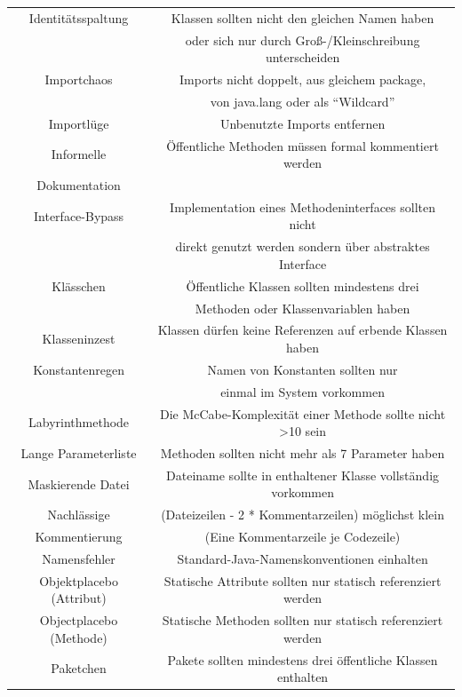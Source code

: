 \documentclass[da,ngerman]{stthesis}
\begin{document}
\begin{center}
\begin{longtabu}{|c|c|}
						\hline
						Identitätsspaltung & Klassen sollten nicht den gleichen Namen haben \\ & oder sich nur durch Groß-/Kleinschreibung unterscheiden \\
						\hline
						Importchaos & Imports nicht doppelt, aus gleichem package, \\ & von java.lang oder als "`Wildcard"' \\
						\hline
						Importlüge & Unbenutzte Imports entfernen \\
						\hline
						Informelle & Öffentliche Methoden müssen formal kommentiert werden \\ Dokumentation & \\
						\hline
						Interface-Bypass & Implementation eines Methodeninterfaces sollten nicht \\ & direkt genutzt werden sondern über abstraktes Interface \\
						\hline
						Klässchen & Öffentliche Klassen sollten mindestens drei \\ & Methoden oder Klassenvariablen haben \\
						\hline
						Klasseninzest & Klassen dürfen keine Referenzen auf erbende Klassen haben \\
						\hline
						Konstantenregen & Namen von Konstanten sollten nur \\ &  einmal im System vorkommen \\
						\hline
						Labyrinthmethode & Die McCabe-Komplexität einer Methode sollte nicht >10 sein \\
						\hline
						Lange Parameterliste & Methoden sollten nicht mehr als 7 Parameter haben \\
						\hline
						Maskierende Datei & Dateiname sollte in enthaltener Klasse vollständig vorkommen \\
						\hline
						Nachlässige & (Dateizeilen - 2 * Kommentarzeilen) möglichst klein \\ Kommentierung & (Eine Kommentarzeile je Codezeile) \\
						\hline
						Namensfehler & Standard-Java-Namenskonventionen einhalten \\
						\hline
						Objektplacebo (Attribut) & Statische Attribute sollten nur statisch referenziert werden \\
						\hline
						Objectplacebo (Methode) & Statische Methoden sollten nur statisch referenziert werden \\
						\hline
						Paketchen & Pakete sollten mindestens drei öffentliche Klassen enthalten \\

\end{longtabu}
\end{center}
\end{document}
